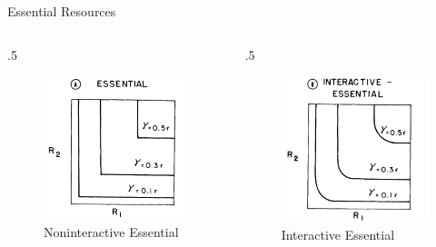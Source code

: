 \documentclass[final,xcolor=dvipsnames]{beamer}
\begin{document}
\begin{frame}[allowframebreaks]{Essential Resources}
 \begin{columns}
  \begin{column}{.5\framewidth}
  \begin{figure}
       \includegraphics[width=.4\framewidth]{Essential1}
       \caption[]{Noninteractive Essential}
    \end{figure}
  \end{column}
  \begin{column}{.5\framewidth}
    \begin{figure}
       \includegraphics[width=.4\framewidth]{InteractiveEssential1}
              \caption[]{Interactive Essential}
    \end{figure}
  \end{column}
 \end{columns}
 \framebreak


\end{frame}
\end{document}
